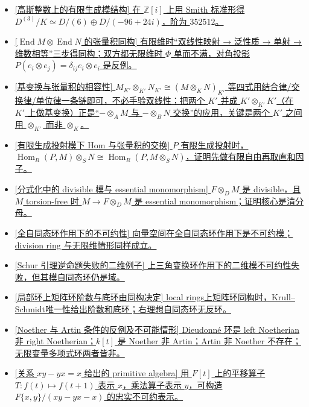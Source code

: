 \documentclass[a4paper]{ctexart}
\theoremstyle{definition}
\theoremstyle{analysis}
\theoremstyle{plain}
\begin{document}
\begin{itemize}
  \item \hyperref[subsec:problem-gaussian-integer-module]{[高斯整数上的有限生成模结构] 在 \(\mathbb Z[i]\) 上用 Smith 标准形得 \(D^{(3)}/K\simeq D/(6)\oplus D/(-96+24i)\)，阶为 \(352512\)。}
  \item \hyperref[subsec:problem-end-tensor-product]{[\(\operatorname{End}M\otimes\operatorname{End}N\) 的张量积同构] 有限维时``双线性映射 → 泛性质 → 单射 → 维数相等''三步得同构；双方都无限维时 \(\Phi\) 单而不满，对角投影 \(P(e_i\otimes e_j)=\delta_{ij}e_i\otimes e_i\) 是反例。}
  \item \hyperref[subsec:problem-base-change-tensor]{[基变换与张量积的相容性] \(M_{K'}\otimes_{K'}N_{K'}\cong(M\otimes_KN)_{K'}\) 等四式用结合律/交换律/单位律一条链即可，不必手验双线性；把两个 \(K'\) 并成 \(K'\otimes_{K'}K'\)（在 \(K'\) 上做基变换）正是``\(-\otimes_AM\) 与 \(-\otimes_BN\) 交换''的应用，关键是两个 \(K'\) 之间用 \(\otimes_{K'}\) 而非 \(\otimes_K\)。}
  \item \hyperref[subsec:problem-projective-hom-tensor]{[有限生成投射模下 Hom 与张量积的交换] \(P\) 有限生成投射时，\(\operatorname{Hom}_R(P,M)\otimes_S N\cong\operatorname{Hom}_R(P,M\otimes_S N)\)，证明先做有限自由再取直和因子。}
  \item \hyperref[subsec:problem-essential-monomorphism-fraction]{[分式化中的 divisible 模与 essential monomorphism] \(F\otimes_D M\) 是 divisible，且 \(M\) torsion-free 时 \(M\to F\otimes_D M\) 是 essential monomorphism；证明核心是清分母。}
  \item \hyperref[subsec:problem-endomorphism-ring-irreducible]{[全自同态环作用下的不可约性] 向量空间在全自同态环作用下是不可约模；division ring 与无限维情形同样成立。}
  \item \hyperref[subsec:problem-schur-converse-counterexample]{[Schur 引理逆命题失败的二维例子] 上三角变换环作用下的二维模不可约性失败，但其模自同态环仍是域。}
  \item \hyperref[subsec:problem-matrix-ring-local-ks]{[局部环上矩阵环阶数与底环由同构决定] local rings上矩阵环同构时，Krull--Schmidt唯一性给出阶数和底环；右理想自同态环无反环。}
  \item \hyperref[subsec:problem-noether-artin-examples]{[Noether 与 Artin 条件的反例及不可能情形] Dieudonn\'e 环是 left Noetherian 非 right Noetherian；\(k[t]\) 是 Noether 非 Artin；Artin 非 Noether 不存在；无限变量多项式环两者皆非。}
  \item \hyperref[subsec:problem-primitive-xy-yx-x]{[关系 \(xy-yx=x\) 给出的 primitive algebra] 用 \(F[t]\) 上的平移算子 \(T:f(t)\mapsto f(t+1)\) 表示 \(x\)，乘法算子表示 \(y\)，可构造 \(F\{x,y\}/(xy-yx-x)\) 的忠实不可约表示。}

\end{itemize}
\end{document}
